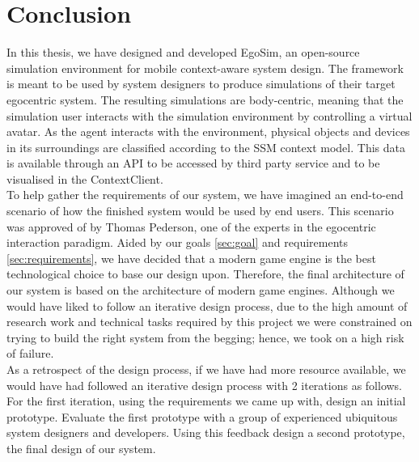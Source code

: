 \section{Conclusion} %
\label{sec:conclusion}

In this thesis, we have designed and developed EgoSim, an open-source simulation environment for mobile context-aware system design. The framework is meant to be used by system designers to produce simulations of their target egocentric system. The resulting simulations are body-centric, meaning that the simulation user interacts with the simulation environment by controlling a virtual avatar. As the agent interacts with the environment, physical objects and devices in its surroundings are classified according to the SSM context model. This data is available through an API to be accessed by third party service and to be visualised in the ContextClient.\\

To help gather the requirements of our system, we have imagined an end-to-end scenario of how the finished system would be used by end users. This scenario was approved of by Thomas Pederson, one of the experts in the egocentric interaction paradigm. Aided by our goals \ref{sec:goal} and requirements \ref{sec:requirements}, we have decided that a modern game engine is the best technological choice to base our design upon. Therefore, the final architecture of our system is based on the architecture of modern game engines. Although we would have liked to follow an iterative design process, due to the high amount of research work and technical tasks required by this project we were constrained on trying to build the right system from the begging; hence, we took on a high risk of failure.\\

As a retrospect of the design process, if we have had more resource available, we would have had followed an iterative design process with 2 iterations as follows. For the first iteration, using the requirements we came up with, design an initial prototype. Evaluate the first prototype with a group of experienced ubiquitous system designers and developers. Using this feedback design a second prototype, the final design of our system.\\

